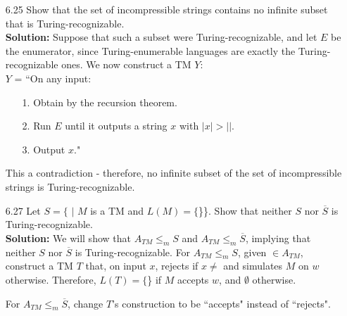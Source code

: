 \begin{enumerate}
\item[6.25]Show that the set of incompressible strings contains no infinite subset that is Turing-recognizable.
\\
\textbf{Solution:} Suppose that such a subset were Turing-recognizable, and let $E$ be the enumerator, since Turing-enumerable languages are exactly the Turing-recognizable ones. We now construct a TM $Y$:
\\
$Y$ = ``On any input:
\begin{enumerate}
\itemsep0em
\item[1.]Obtain  by the recursion theorem.
\item[2.]Run $E$ until it outputs a string $x$ with $|x| > |$$|$.
\item[3.]Output $x$."
\end{enumerate}
This a contradiction - therefore, no infinite subset of the set of incompressible strings is Turing-recognizable.

\item[6.27]Let $S = \{$ $|$ $M$ is a TM and $L(M) = \{$\}\}. Show that neither $S$ nor $\overline{S}$ is Turing-recognizable.
\\
\textbf{Solution:} We will show that $A_{TM} \le_m S$ and $A_{TM} \le_m \overline{S}$, implying that neither $S$ nor $\overline{S}$ is Turing-recognizable. For $A_{TM} \le_m S$, given  $\in A_{TM}$, construct a TM $T$ that, on input $x$, rejects if $x \ne$  and simulates $M$ on $w$ otherwise. Therefore, $L(T) = \{$\} if $M$ accepts $w$, and $\emptyset$ otherwise.

\par For $A_{TM} \le_m \overline{S}$, change $T$'s construction to be ``accepts" instead of ``rejects". 
\end{enumerate}
